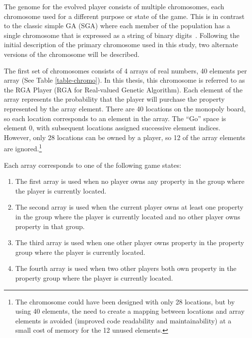 The genome for the evolved player consists of multiple chromosomes, each
chromosome used for a different purpose or state of the game. This is in
contrast to the classic simple GA (SGA) where each member of the population has
a single chromosome that is expressed as a string of binary
digits~\cite{haupt2004practical}. Following the initial description of the
primary chromosome used in this study, two alternate versions of the chromosome
will be described.

The first set of chromosomes consists of 4 arrays of real numbers, 40 elements
per array (See Table \ref{table-chromo}). In this thesis, this chromosome is
referred to as the RGA Player (RGA for Real-valued Genetic Algorithm). Each
element of the array represents the probability that the player will purchase
the property represented by the array element. There are 40 locations on the
monopoly board, so each location corresponds to an element in the array. The
``Go'' space is element 0, with subsequent locations assigned successive element
indices. However, only 28 locations can be owned by a player, so 12 of the array
elements are ignored.\footnote{The chromosome could have been designed with
only 28 locations, but by using 40 elements, the need to create a mapping
between locations and array elements is avoided (improved code readability and
maintainability) at a small cost of memory for the 12 unused elements.}

Each array corresponds to one of the following game states:

\begin{enumerate}
  \item{The first array is used when no player owns any property in the group
  where the player is currently located.}
  \item{The second array is used when the current player owns at least one
  property in the group where the player is currently located and no other
  player owns property in that group.}
  \item{The third array is used when one other player owns property in the
  property group where the player is currently located.}
  \item{The fourth array is used when two other players both own property in the
  property group where the player is currently located.}
\end{enumerate}

